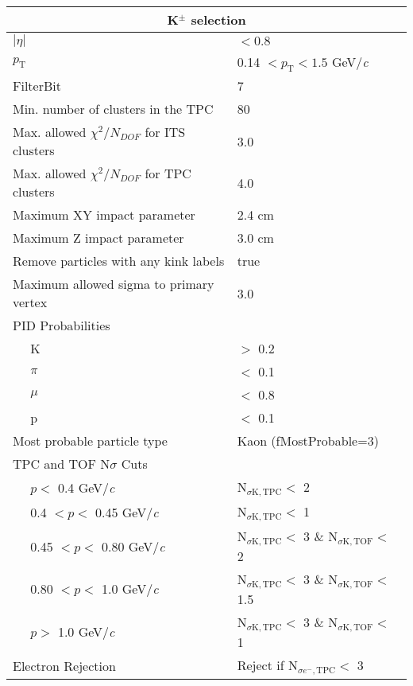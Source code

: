 \documentclass[ALICE,manyauthors]{cernphprep}
\begin{document}
\begin{table}[htbp]
 \centering
  \begin{tabular}{lc|c|l}
   \hline  
   \multicolumn{4}{c}{K$^{\pm}$ selection} \\
   \hline
   \multicolumn{3}{l|}{$|\eta|$} & $< 0.8$ \\
   \hline
   \multicolumn{3}{l|}{$p_{\mathrm{T}}$} & 0.14 $< p_{\mathrm{T}} < 1.5$ GeV/\textit{c} \\
   \hline
   \multicolumn{3}{l|}{FilterBit} & 7 \\
   \hline
   \multicolumn{3}{l|}{Min. number of clusters in the TPC} & 80 \\
   \hline
   \multicolumn{3}{l|}{Max. allowed $\chi^{2}/N_{DOF}$ for ITS clusters} & 3.0 \\
   \hline
   \multicolumn{3}{l|}{Max. allowed $\chi^{2}/N_{DOF}$ for TPC clusters} & 4.0 \\
   \hline   
   \multicolumn{3}{l|}{Maximum XY impact parameter} & 2.4 cm \\
   \hline
   \multicolumn{3}{l|}{Maximum Z impact parameter} & 3.0 cm \\
   \hline
   \multicolumn{3}{l|}{Remove particles with any kink labels} & true \\
   \hline
   \multicolumn{3}{l|}{Maximum allowed sigma to primary vertex} & 3.0 \\
   \hline   
   
   \multicolumn{4}{l}{PID Probabilities} \\
   \hline
    & \multicolumn{2}{l|}{K} & $>$ 0.2 \\
   \hline
    & \multicolumn{2}{l|}{$\pi$} & $<$ 0.1 \\
   \hline
    & \multicolumn{2}{l|}{$\mu$} & $<$ 0.8 \\
   \hline
    & \multicolumn{2}{l|}{p} & $<$ 0.1 \\
   \hline
   
   \multicolumn{3}{l|}{Most probable particle type} & Kaon (fMostProbable=3) \\
   \hline
   
   \multicolumn{4}{l}{TPC and TOF N$\sigma$ Cuts} \\
   \cline{2-4}
    & \multicolumn{1}{l}{$p <$ 0.4 GeV/\textit{c}} &  & N$_{\sigma \mathrm{K,TPC}} <$ 2 \\
   \cline{2-4}
    & \multicolumn{1}{l}{0.4 $< p <$ 0.45 GeV/\textit{c}} & & N$_{\sigma \mathrm{K,TPC}} <$ 1 \\
   \cline{2-4}     
    & \multicolumn{1}{l}{0.45 $< p <$ 0.80 GeV/\textit{c}} & & N$_{\sigma \mathrm{K,TPC}} <$ 3 \& N$_{\sigma \mathrm{K,TOF}} <$ 2 \\ 
   \cline{2-4}
    & \multicolumn{1}{l}{0.80 $< p <$ 1.0 GeV/\textit{c}} & & N$_{\sigma \mathrm{K,TPC}} <$ 3 \& N$_{\sigma \mathrm{K,TOF}} <$ 1.5 \\ 
   \cline{2-4}
    & \multicolumn{1}{l}{$p >$ 1.0 GeV/\textit{c}} & & N$_{\sigma \mathrm{K,TPC}} <$ 3 \& N$_{\sigma \mathrm{K,TOF}} <$ 1 \\ 
   \hline
   \multicolumn{3}{l|}{Electron Rejection} & Reject if N$_{\sigma e^{-},\mathrm{TPC}} < $ 3 \\
   \hline
   

\end{tabular}
\end{table}
\end{document}
